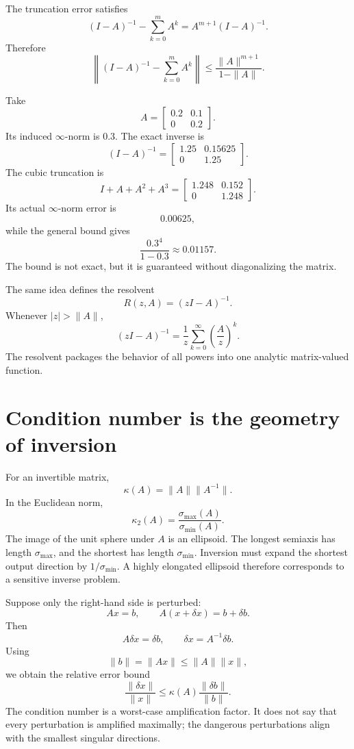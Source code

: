 The truncation error satisfies
\[
  (I-A)^{-1}-\sum_{k=0}^mA^k
  =A^{m+1}(I-A)^{-1}.
\]
Therefore
\[
  \left\|(I-A)^{-1}-\sum_{k=0}^mA^k\right\|
  \le
  \frac{\|A\|^{m+1}}{1-\|A\|}.
\]

Take
\[
  A=
  \begin{bmatrix}
    0.2&0.1\\
    0&0.2
  \end{bmatrix}.
\]
Its induced \(\infty\)-norm is \(0.3\).  The exact inverse is
\[
  (I-A)^{-1}
  =
  \begin{bmatrix}
    1.25&0.15625\\
    0&1.25
  \end{bmatrix}.
\]
The cubic truncation is
\[
  I+A+A^2+A^3
  =
  \begin{bmatrix}
    1.248&0.152\\
    0&1.248
  \end{bmatrix}.
\]
Its actual \(\infty\)-norm error is
\[
  0.00625,
\]
while the general bound gives
\[
  \frac{0.3^4}{1-0.3}
  \approx0.01157.
\]
The bound is not exact, but it is guaranteed without diagonalizing the matrix.

The same idea defines the resolvent
\[
  R(z,A)=(zI-A)^{-1}.
\]
Whenever \(|z|>\|A\|\),
\[
  (zI-A)^{-1}
  =\frac1z\sum_{k=0}^\infty\left(\frac{A}{z}\right)^k.
\]
The resolvent packages the behavior of all powers into one analytic matrix-valued function.

\section{Condition number is the geometry of inversion}

For an invertible matrix,
\[
  \kappa(A)=\|A\|\|A^{-1}\|.
\]
In the Euclidean norm,
\[
  \kappa_2(A)
  =\frac{\sigma_{\max}(A)}{\sigma_{\min}(A)}.
\]
The image of the unit sphere under \(A\) is an ellipsoid.  The longest semiaxis has length \(\sigma_{\max}\), and the shortest has length \(\sigma_{\min}\).  Inversion must expand the shortest output direction by \(1/\sigma_{\min}\).  A highly elongated ellipsoid therefore corresponds to a sensitive inverse problem.

Suppose only the right-hand side is perturbed:
\[
  Ax=b,
  \qquad
  A(x+\delta x)=b+\delta b.
\]
Then
\[
  A\delta x=\delta b,
  \qquad
  \delta x=A^{-1}\delta b.
\]
Using
\[
  \|b\|=\|Ax\|\le\|A\|\|x\|,
\]
we obtain the relative error bound
\[
  \boxed{
  \frac{\|\delta x\|}{\|x\|}
  \le
  \kappa(A)
  \frac{\|\delta b\|}{\|b\|}.}
\]
The condition number is a worst-case amplification factor.  It does not say that every perturbation is amplified maximally; the dangerous perturbations align with the smallest singular directions.

